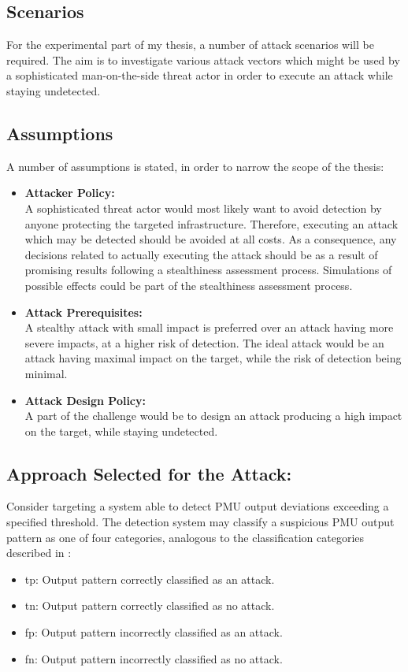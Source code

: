 \subsection{Scenarios}
For the experimental part of my thesis, a number of attack scenarios will be required. The aim is to investigate various attack vectors which might be used by a sophisticated man-on-the-side threat actor in order to execute an attack while staying undetected. 

\subsection{Assumptions} 
A number of assumptions is stated, in order to narrow the scope of the thesis:
\begin{itemize}
    \item \textbf{Attacker Policy:}\\   A sophisticated threat actor would most likely want to avoid detection by anyone protecting the targeted infrastructure.
Therefore, executing an attack which may be detected should be avoided at all costs.
As a consequence, any decisions related to actually executing the attack should be as a result of promising results following a stealthiness assessment process. Simulations of possible effects could be part of the stealthiness assessment process. 
\item \textbf{Attack Prerequisites:}\\   A stealthy attack with small impact is preferred over an attack having more severe impacts, at a higher risk of detection.
The ideal attack would be an attack having maximal impact on the target, while the risk of detection being minimal. 
\item \textbf{Attack Design Policy:}\\   A part of the challenge would be to design an attack producing a high impact on the target, while staying undetected.
\end{itemize}
\subsection{Approach Selected for the Attack:}


Consider targeting a system able to detect PMU output deviations exceeding a specified threshold. The detection system may classify a suspicious PMU output pattern as one of four categories, analogous to the classification categories described in \cite[p. 5]{kunang2021attack}: 
\begin{itemize}
    \item \acrfull{tp}: Output pattern correctly classified as an attack.
    \item \acrfull{tn}:  Output pattern correctly classified as no attack.
    \item \acrfull{fp}: Output pattern incorrectly classified as an attack.
    \item \acrfull{fn}: Output pattern incorrectly classified as no attack.
\end{itemize}


